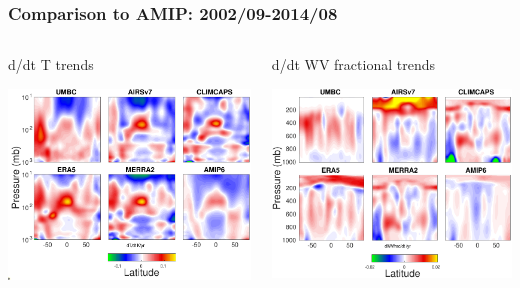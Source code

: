 \documentclass[10pt,t]{beamer}
\begin{document}
\begin{frame}
\frametitle{Comparison to AMIP: 2002/09-2014/08}

\vspace{-0.1in}

\begin{columns}
\begin{column}{0.5\columnwidth}
\begin{block}{\small d/dt T trends}
\vspace{-0.1in}
\begin{center}
\includegraphics[width=\linewidth]{Figs2002_2014/tz_trends_2002_2014.pdf}
\end{center}
\end{block}
\end{column}


\begin{column}{0.5\columnwidth}
\begin{block}{\small d/dt WV fractional trends}
\vspace{-0.1in}
\begin{center}
\includegraphics[width=\linewidth]{Figs2002_2014/wvfrac_trends_2002_2014.pdf}
\end{center}
\end{block}
\end{column}


\end{columns}
\end{frame}
\end{document}
